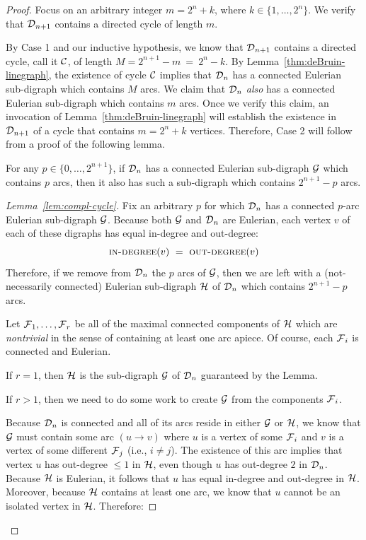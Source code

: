 \begin{proof}
\smallskip

\noindent
Focus on an arbitrary integer $m = 2^n +k$, where $k \in \{1, \ldots, 2^n\}$.  We verify that $\mbox{$\cal D$}_{n+1}$ contains a directed cycle of length $m$.

\medskip

By Case 1 and our inductive hypothesis, we know that $\mbox{$\cal D$}_{n+1}$ contains a directed cycle, call
it $\mbox{$\cal C$}$, of length $M = 2^{n+1} - m \ = \ 2^n -k$.  By Lemma~\ref{thm:deBruin-linegraph}, the
existence  of cycle $\mbox{$\cal C$}$ implies that $\mbox{$\cal D$}_n$ has a connected Eulerian sub-digraph which contains $M$ arcs.  We claim that $\mbox{$\cal D$}_n$ {\em also} has a connected Eulerian sub-digraph which contains $m$ arcs.  Once we verify this claim, an invocation of 
Lemma~\ref{thm:deBruin-linegraph} will establish the existence in $\mbox{$\cal D$}_{n+1}$ of a cycle that contains $m = 2^n +k$ vertices.  Therefore, Case 2 will follow from a proof of the following lemma.

\begin{lemma}
\label{lem:compl-cycle}
For any $p \in \{0, \ldots, 2^{n+1}\}$, if $\mbox{$\cal D$}_n$ has a connected Eulerian sub-digraph $\mbox{$\cal G$}$ which
contains $p$ arcs, then it also has such a sub-digraph which contains $2^{n+1} - p$ arcs.
\end{lemma}

\begin{proof}[Lemma~\ref{lem:compl-cycle}]
Fix an arbitrary $p$ for which $\mbox{$\cal D$}_n$ has a connected $p$-arc Eulerian sub-digraph $\mbox{$\cal G$}$.  Because both $\mbox{$\cal G$}$ and $\mbox{$\cal D$}_n$ are Eulerian, each vertex $v$ of each of these digraphs has equal in-degree and out-degree:
\[ \mbox{\sc in-degree}(v) \ = \ \mbox{\sc out-degree}(v) \]
Therefore, if we remove from $\mbox{$\cal D$}_n$ the $p$ arcs of $\mbox{$\cal G$}$, then we are left with a (not-necessarily connected) Eulerian sub-digraph $\mbox{$\cal H$}$ of $\mbox{$\cal D$}_n$ which contains $2^{n+1} - p$ arcs.

\smallskip

Let $\mbox{$\cal F$}_1, \ldots, \mbox{$\cal F$}_r$ be all of the maximal connected components of $\mbox{$\cal H$}$ which are {\em nontrivial} in the sense of containing at least one arc apiece.  Of course, each $\mbox{$\cal F$}_i$ is connected and Eulerian.

\smallskip

If $r=1$, then $\mbox{$\cal H$}$ is the sub-digraph $\mbox{$\cal G$}$ of $\mbox{$\cal D$}_n$ guaranteed by the Lemma.

If $r>1$, then we need to do some work to create $\mbox{$\cal G$}$ from the components $\mbox{$\cal F$}_i$.

\smallskip

\noindent
Because $\mbox{$\cal D$}_n$ is connected and all of its arcs reside in either $\mbox{$\cal G$}$ or $\mbox{$\cal H$}$, we know that $\mbox{$\cal G$}$ must contain some arc $(u \rightarrow v)$ where $u$ is a vertex of some $\mbox{$\cal F$}_i$ and $v$ is a vertex of some different $\mbox{$\cal F$}_j$ (i.e., $i \neq j$).  The existence of this arc implies that vertex $u$ has out-degree $\leq 1$ in $\mbox{$\cal H$}$, even though $u$ has out-degree $2$ in $\mbox{$\cal D$}_n$.  Because $\mbox{$\cal H$}$ is Eulerian, it follows that $u$ has equal in-degree and out-degree in $\mbox{$\cal H$}$.  Moreover, because $\mbox{$\cal H$}$ contains at least one arc, we know that $u$ cannot be an isolated vertex in $\mbox{$\cal H$}$.  Therefore:


\end{proof}
\end{proof}
